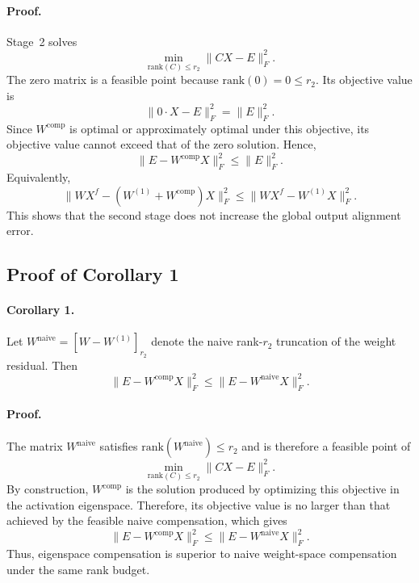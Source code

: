 \documentclass[a4paper,fleqn]{cas-dc}
\begin{document}
\paragraph{Proof.}
Stage~2 solves
\begin{equation}
\min_{\mathrm{rank}(C)\le r_2} \|CX-E\|_F^2.
\end{equation}
The zero matrix is a feasible point because $\mathrm{rank}(0)=0\le r_2$. Its objective value is
\begin{equation}
\|0\cdot X - E\|_F^2 = \|E\|_F^2.
\end{equation}
Since $W^{\mathrm{comp}}$ is optimal or approximately optimal under this objective, its objective value cannot exceed that of the zero solution. Hence,
\begin{equation}
\|E - W^{\mathrm{comp}}X\|_F^2 \le \|E\|_F^2.
\end{equation}
Equivalently,
\begin{equation}
\|WX^f - (W^{(1)} + W^{\mathrm{comp}})X\|_F^2
\le
\|WX^f - W^{(1)}X\|_F^2.
\end{equation}
This shows that the second stage does not increase the global output alignment error.

\subsection{Proof of Corollary 1}

\paragraph{Corollary 1.}
Let $W^{\mathrm{naive}} = [W-W^{(1)}]_{r_2}$ denote the naive rank-$r_2$ truncation of the weight residual. Then
\begin{equation}
\|E - W^{\mathrm{comp}}X\|_F^2 \le \|E - W^{\mathrm{naive}}X\|_F^2.
\end{equation}

\paragraph{Proof.}
The matrix $W^{\mathrm{naive}}$ satisfies $\mathrm{rank}(W^{\mathrm{naive}})\le r_2$ and is therefore a feasible point of
\begin{equation}
\min_{\mathrm{rank}(C)\le r_2} \|CX-E\|_F^2.
\end{equation}
By construction, $W^{\mathrm{comp}}$ is the solution produced by optimizing this objective in the activation eigenspace. Therefore, its objective value is no larger than that achieved by the feasible naive compensation, which gives
\begin{equation}
\|E - W^{\mathrm{comp}}X\|_F^2 \le \|E - W^{\mathrm{naive}}X\|_F^2.
\end{equation}
Thus, eigenspace compensation is superior to naive weight-space compensation under the same rank budget.
\end{document}
